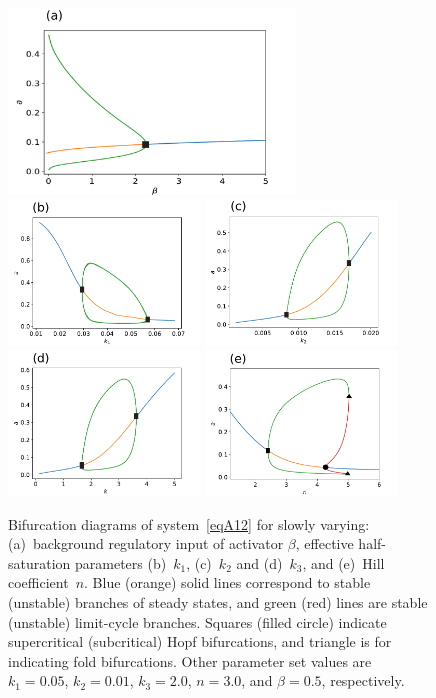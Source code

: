 \documentclass[%
 preprint,
 aip, 
 amsmath,amssymb,
]{revtex4-2}
\begin{document}
	
	\begin{figure} %
		\centering
		\includegraphics[width=3in]{Figures/ApFigure01a.pdf} \\
		\includegraphics[width=2in]{Figures/ApFigure01b}
		\includegraphics[width=2in]{Figures/ApFigure01c} \\
		\includegraphics[width=2in]{Figures/ApFigure01d}
		\includegraphics[width=2in]{Figures/ApFigure01e}
		\caption{Bifurcation diagrams of system~\eqref{eqA12} for slowly varying: (a)~background regulatory input of activator $\beta$, effective half-saturation parameters (b)~$k_1$, (c)~$k_2$ and (d)~$k_3$, and (e)~Hill coefficient~$n$. Blue (orange) solid lines correspond to stable (unstable) branches of steady states, and green (red) lines are stable (unstable) limit-cycle branches. Squares (filled circle) indicate supercritical (subcritical) Hopf bifurcations, and triangle is for indicating fold bifurcations. Other parameter set values are $k_1 = 0.05$, $k_2 = 0.01$, $k_3 = 2.0$, $n=3.0$, and $\beta=0.5$, respectively.}
		\label{FigA01}
	\end{figure}
\end{document}
